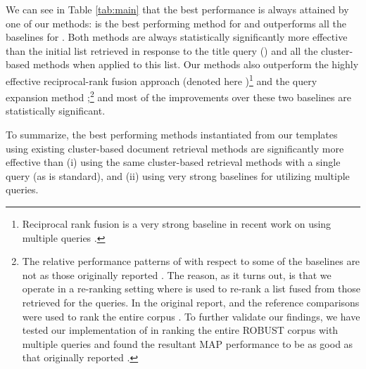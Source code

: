 We can see in Table \ref{tab:main} that the best performance is always
attained by one of our methods: \inst{\interp}{\queryCat} is the best
performing method for \robust and \inst{\clustMRF}{\clustFuse}
outperforms all the baselines for \cw. Both methods are always
statistically significantly more effective than the initial list
retrieved in response to the title query (\init) and all the cluster-based
methods when applied to this list. Our methods also outperform the
highly effective reciprocal-rank fusion approach (denoted here
\inst{\init}{\fuseClust})\footnote{Reciprocal rank fusion is a very
  strong baseline in recent work on using multiple queries
  \cite{bc17-adcs}.} and the query expansion method
\ariRM;\footnote{The relative performance patterns of \ariRM with
  respect to some of the baselines are not as those originally
  reported \cite{Lu+al:19a}. The reason, as it turns out, is that we
  operate in a re-ranking setting where \ariRM is used to re-rank a
  list fused from those retrieved for the queries. In the original
  report, \ariRM and the reference comparisons were used to rank the
  entire corpus \cite{Lu+al:19a}. To further validate our findings, we have tested our
  implementation of \ariRM in ranking the entire ROBUST corpus with
  multiple queries and found the resultant MAP performance to be as
  good as that originally reported \cite{Lu+al:19a}.} and most of the improvements over these two baselines are statistically
  significant.

  To summarize, the best performing methods instantiated from our
  templates using existing cluster-based document retrieval methods are significantly more
  effective than (i) using the same cluster-based retrieval methods with a
  single query (as is standard), and (ii) using very strong baselines for
  utilizing multiple queries.

